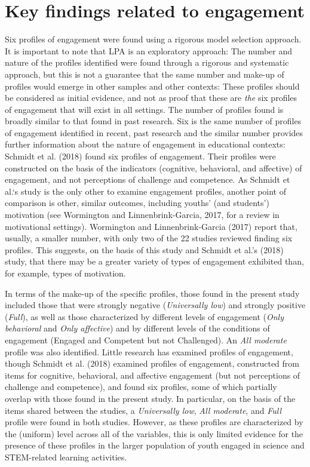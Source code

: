 \documentclass[]{book}
\theoremstyle{definition}
\theoremstyle{definition}
\theoremstyle{definition}
\theoremstyle{remark}
\begin{document}
\section{Key findings related to
engagement}\label{key-findings-related-to-engagement}

Six profiles of engagement were found using a rigorous model selection
approach. It is important to note that LPA is an exploratory approach:
The number and nature of the profiles identified were found through a
rigorous and systematic approach, but this is not a guarantee that the
same number and make-up of profiles would emerge in other samples and
other contexts: These profiles should be considered as initial evidence,
and not as proof that these are \emph{the} six profiles of engagement
that will exist in all settings. The number of profiles found is broadly
similar to that found in past research. Six is the same number of
profiles of engagement identified in recent, past research and the
similar number provides further information about the nature of
engagement in educational contexts: Schmidt et al. (2018) found six
profiles of engagement. Their profiles were constructed on the basis of
the indicators (cognitive, behavioral, and affective) of engagement, and
not perceptions of challenge and competence. As Schmidt et al.`s study
is the only other to examine engagement profiles, another point of
comparison is other, similar outcomes, including youths' (and students')
motivation (see Wormington and Linnenbrink-Garcia, 2017, for a review in
motivational settings). Wormington and Linnenbrink-Garcia (2017) report
that, usually, a smaller number, with only two of the 22 studies
reviewed finding six profiles. This suggests, on the basis of this study
and Schmidt et al.'s (2018) study, that there may be a greater variety
of types of engagement exhibited than, for example, types of motivation.

In terms of the make-up of the specific profiles, those found in the
present study included those that were strongly negative
(\emph{Universally low}) and strongly positive (\emph{Full}), as well as
those characterized by different levels of engagement (\emph{Only
behavioral} and \emph{Only affective}) and by different levels of the
conditions of engagement (Engaged and Competent but not Challenged). An
\emph{All moderate} profile was also identified. Little research has
examined profiles of engagement, though Schmidt et al. (2018) examined
profiles of engagement, constructed from items for cognitive,
behavioral, and affective engagement (but not perceptions of challenge
and competence), and found six profiles, some of which partially overlap
with those found in the present study. In particular, on the basis of
the items shared between the studies, a \emph{Universally low},
\emph{All moderate}, and \emph{Full} profile were found in both studies.
However, as these profiles are characterized by the (uniform) level
across all of the variables, this is only limited evidence for the
presence of these profiles in the larger population of youth engaged in
science and STEM-related learning activities.
\end{document}
